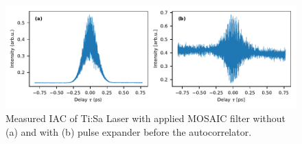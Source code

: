 \begin{figure}[H]
	\centering
	\includegraphics[width=\linewidth]{figures/chirp/plots/measured_chirped_laser_pulse_after_MOSAIC}
	\caption{Measured IAC of Ti:Sa Laser with applied MOSAIC filter without (a) and with (b) pulse expander before the autocorrelator.}
	\label{fig:measuredchirpedlaserpulseaftermosaic}
\end{figure}


